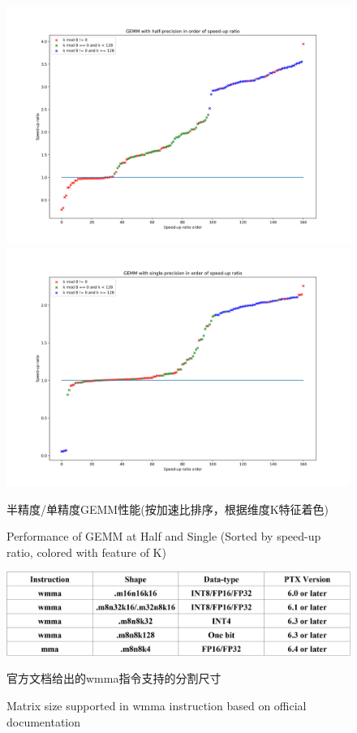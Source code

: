 \begin{figure}
	\centering
	\includegraphics[width=15cm]{figures/GEMM-Half-TF-Byratio-Tri.jpg}\\
	\includegraphics[width=15cm]{figures/GEMM-Single-TF-Byratio-Tri.jpg}
	\renewcommand{\thefigure}{\arabic{section}-\arabic{figure} }
	\renewcommand{\figurename}{图}
	\caption{半精度/单精度GEMM性能(按加速比排序，根据维度K特征着色)}
	\addtocounter{figure}{-1}
	\renewcommand{\thefigure}{\arabic{section}-\arabic{figure} }
	\renewcommand{\figurename}{Figure}
	\caption{Performance of GEMM at Half and Single (Sorted by speed-up ratio, colored with feature of K)}
	\label{Fig-PerfGemmByratioTri}
\end{figure}
\begin{figure}
	\centering
	\includegraphics[width=15cm]{figures/WMMADOC.jpg}
	\renewcommand{\thefigure}{\arabic{section}-\arabic{figure} }
	\renewcommand{\figurename}{图}
	\caption{官方文档给出的wmma指令支持的分割尺寸\cite{PTX}}
	\addtocounter{figure}{-1}
	\renewcommand{\thefigure}{\arabic{section}-\arabic{figure} }
	\renewcommand{\figurename}{Figure}
	\caption{Matrix size supported in wmma instruction based on official documentation}
	\label{Fig.WMMADOC}
\end{figure}

